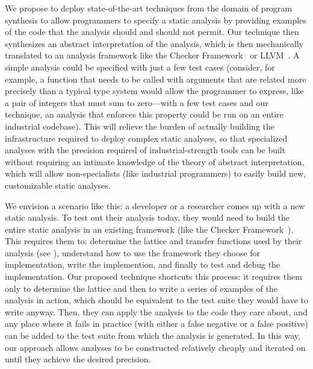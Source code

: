 \documentclass[10pt,conference]{IEEEtran}
\begin{document}
We propose to deploy state-of-the-art techniques from the domain of program
synthesis to allow programmers to specify a static analysis by providing
examples of the code that the analysis should and should not permit.
Our technique then synthesizes an abstract interpretation of the analysis,
which is then mechanically translated to an analysis framework like
the Checker Framework~\cite{checker-framework} or LLVM~\cite{lattner04:_llvm}.
A simple analysis could be specified
with just a few test cases (consider, for example, a function that needs to
be called with arguments that are related more precisely than a typical
type system would allow the programmer to express, like a pair of integers that
must sum to zero---with a few test cases and our technique, an analysis that
enforces this property could be run on an entire industrial codebase).
This will relieve the burden of actually building the infrastructure
required to deploy complex static analyses, so that specialized analyses
with the precision required of industrial-strength tools can be built without
requiring an intimate knowledge of the theory of abstract interpretation,
which will allow non-specialists (like industrial programmers) to easily
build new, customizable static analyses.

We envision a scenario like this: a developer or a researcher comes up with
a new static analysis. To test out their analysis today, they would need
to build the entire static analysis in an existing framework (like the Checker
Framework~\cite{checker-framework}). This requires them to: determine
the lattice and transfer functions used by their analysis (see ),
understand how
to use the framework they choose for implementation, write the implemention,
and finally to test and debug the implementation. Our proposed technique
shortcuts this process: it requires them only to determine the lattice
and then to write a series of examples of the analysis in action, which
should be equivalent to the test suite they would have to write anyway.
Then, they can apply the analysis to the code they care about, and any
place where it fails in practice (with either a false negative or a false
positive) can be added to the test suite from which the analysis
is generated. In this way, our approach allows analyses to be constructed
relatively cheaply and iterated on until they achieve the desired precision.
\end{document}
